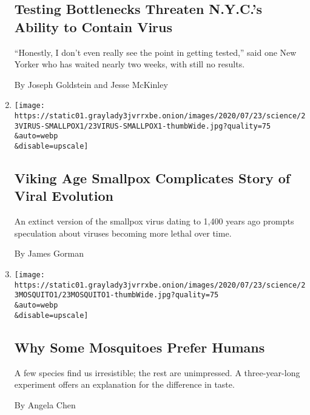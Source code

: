 \begin{enumerate}
  \hypertarget{testing-bottlenecks-threaten-nycs-ability-to-contain-virus}{%
  \subsection{Testing Bottlenecks Threaten N.Y.C.'s Ability to Contain
  Virus}\label{testing-bottlenecks-threaten-nycs-ability-to-contain-virus}}

  ``Honestly, I don't even really see the point in getting tested,''
  said one New Yorker who has waited nearly two weeks, with still no
  results.

  By Joseph Goldstein and Jesse McKinley
\item
  \href{/2020/07/23/science/smallpox-vikings-genetics.html}{}

  \texttt{[image: https://static01.graylady3jvrrxbe.onion/images/2020/07/23/science/23VIRUS-SMALLPOX1/23VIRUS-SMALLPOX1-thumbWide.jpg?quality=75\\\&auto=webp\\\&disable=upscale]}

  \hypertarget{viking-age-smallpox-complicates-story-of-viral-evolution}{%
  \subsection{Viking Age Smallpox Complicates Story of Viral
  Evolution}\label{viking-age-smallpox-complicates-story-of-viral-evolution}}

  An extinct version of the smallpox virus dating to 1,400 years ago
  prompts speculation about viruses becoming more lethal over time.

  By James Gorman
\item
  \href{/2020/07/23/science/mosquitoes-genetics-africa.html}{}

  \texttt{[image: https://static01.graylady3jvrrxbe.onion/images/2020/07/23/science/23MOSQUITO1/23MOSQUITO1-thumbWide.jpg?quality=75\\\&auto=webp\\\&disable=upscale]}

  \hypertarget{why-some-mosquitoes-prefer-humans}{%
  \subsection{Why Some Mosquitoes Prefer
  Humans}\label{why-some-mosquitoes-prefer-humans}}

  A few species find us irresistible; the rest are unimpressed. A
  three-year-long experiment offers an explanation for the difference in
  taste.

  By Angela Chen
\end{enumerate}

